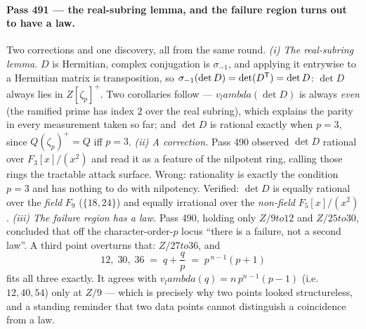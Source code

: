 \documentclass[12pt,a4paper]{article}
\def\mathbb#1{#1}%
\def\textbf#1{#1}%
\def\lambda{lambda}%
\def\to{ to }%
\theoremstyle{definition}
\newcommand{\FF}{\mathbb{F}}
\newcommand{\QQ}{\mathbb{Q}}
\newcommand{\ZZ}{\mathbb{Z}}
\begin{document}
\paragraph{Pass 491 --- the real-subring lemma, and the failure region turns out
to have a law.}
Two corrections and one discovery, all from the same round.  \emph{(i) The
real-subring lemma.}  $D$ is Hermitian, complex conjugation is $\sigma_{-1}$,
and applying it entrywise to a Hermitian matrix is transposition, so
$\sigma_{-1}(\det D)=\det(D^{\sf T})=\det D$: \textbf{$\det D$ always lies in
$\ZZ[\zeta_p]^{+}$}.  Two corollaries follow --- $v_\lambda(\det D)$ is always
\emph{even} (the ramified prime has index $2$ over the real subring), which
explains the parity in every measurement taken so far; and $\det D$ is rational
exactly when $p=3$, since $\QQ(\zeta_p)^{+}=\QQ$ iff $p=3$.  \emph{(ii) A
correction.}  Pass 490 observed $\det D$ rational over $\FF_3[x]/(x^2)$ and read
it as a feature of the nilpotent ring, calling those rings the tractable attack
surface.  \textbf{Wrong}: rationality is exactly the condition $p=3$ and has
nothing to do with nilpotency.  Verified: $\det D$ is equally rational over the
\emph{field} $\FF_9$ ($\{18,24\}$) and equally irrational over the
\emph{non-field} $\FF_5[x]/(x^2)$.  \emph{(iii) The failure region has a law.}
Pass 490, holding only $\ZZ/9\to12$ and $\ZZ/25\to30$, concluded that off the
character-order-$p$ locus ``there is a failure, not a second law''.  A third
point overturns that: $\ZZ/27\to36$, and
\[
12,\;30,\;36\;=\;q+\frac qp\;=\;p^{\,n-1}(p+1)
\]
fits all three exactly.  It agrees with $v_\lambda(q)=n\,p^{n-1}(p-1)$ (i.e.\
$12,40,54$) only at $\ZZ/9$ --- which is precisely why two points looked
structureless, and a standing reminder that two data points cannot distinguish
a coincidence from a law.
\end{document}
